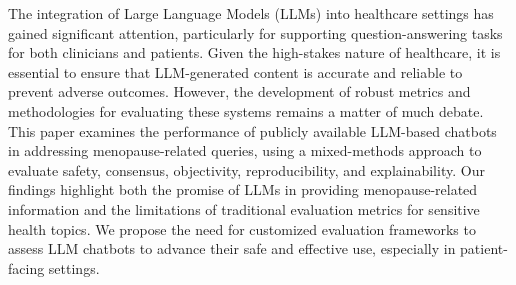The integration of Large Language Models (LLMs) into healthcare settings has gained significant attention, particularly for supporting question-answering tasks for both clinicians and patients. 
Given the high-stakes nature of healthcare, it is essential to ensure that LLM-generated content is accurate and reliable to prevent adverse outcomes. However, the development of robust metrics and methodologies for evaluating these systems remains a matter of much debate. 
This paper examines the performance of publicly available LLM-based chatbots in addressing menopause-related queries, using a mixed-methods approach to evaluate safety, consensus, objectivity, reproducibility, and explainability. 
Our findings highlight both the promise of LLMs in providing menopause-related information and the limitations of traditional evaluation metrics for sensitive health topics. 
We propose the need for customized evaluation frameworks to assess LLM chatbots to advance their safe and effective use, especially in patient-facing settings.